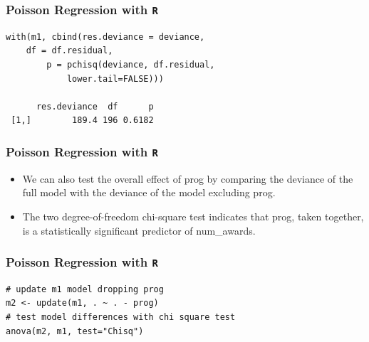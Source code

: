 \documentclass[00-GLMregslides.tex]{subfiles}
\begin{document}
\begin{frame}[fragile]

\frametitle{Poisson Regression with \texttt{R}}
\large

\begin{framed}
\begin{verbatim}
with(m1, cbind(res.deviance = deviance, 
	df = df.residual,
        p = pchisq(deviance, df.residual, 
            lower.tail=FALSE)))
 
      res.deviance  df      p
 [1,]        189.4 196 0.6182
\end{verbatim}
\end{framed}
\end{frame}

\begin{frame}[fragile]

\frametitle{Poisson Regression with \texttt{R}}
\Large 
\begin{itemize}
\item 
We can also test the overall effect of prog by comparing the deviance of the full model with the deviance of the model 
excluding prog.
\item The two degree-of-freedom chi-square test indicates that prog, taken together, is a statistically significant predictor of num\_awards.
\end{itemize} 

\end{frame}

\begin{frame}[fragile]

\frametitle{Poisson Regression with \texttt{R}}
\large

\begin{framed}
\begin{verbatim}
# update m1 model dropping prog
m2 <- update(m1, . ~ . - prog)
# test model differences with chi square test
anova(m2, m1, test="Chisq")
\end{verbatim}
\end{framed}
\end{frame}
\end{document}
